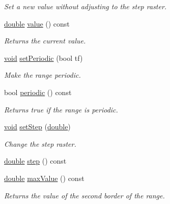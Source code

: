 \begin{DoxyCompactItemize}
\begin{DoxyCompactList}\small\item\em Set a new value without adjusting to the step raster. \end{DoxyCompactList}\item 
\hyperlink{_super_l_u_support_8h_a8956b2b9f49bf918deed98379d159ca7}{double} \hyperlink{class_qwt_double_range_a7777cf257c812579c4891512f1b6cad0}{value} () const 
\begin{DoxyCompactList}\small\item\em Returns the current value. \end{DoxyCompactList}\item 
\hyperlink{group___u_a_v_objects_plugin_ga444cf2ff3f0ecbe028adce838d373f5c}{void} \hyperlink{class_qwt_double_range_a95fa6a4e44fc47726d939155bb6f6f1f}{set\-Periodic} (bool tf)
\begin{DoxyCompactList}\small\item\em Make the range periodic. \end{DoxyCompactList}\item 
bool \hyperlink{class_qwt_double_range_ad1efbcbf29dbc74f3f378292b76b007b}{periodic} () const 
\begin{DoxyCompactList}\small\item\em Returns true if the range is periodic. \end{DoxyCompactList}\item 
\hyperlink{group___u_a_v_objects_plugin_ga444cf2ff3f0ecbe028adce838d373f5c}{void} \hyperlink{class_qwt_double_range_a29ed5fc66439def424a8ad773eea285d}{set\-Step} (\hyperlink{_super_l_u_support_8h_a8956b2b9f49bf918deed98379d159ca7}{double})
\begin{DoxyCompactList}\small\item\em Change the step raster. \end{DoxyCompactList}\item 
\hyperlink{_super_l_u_support_8h_a8956b2b9f49bf918deed98379d159ca7}{double} \hyperlink{class_qwt_double_range_a0cb8cc60548c10cb1d98e54387961967}{step} () const 
\item 
\hyperlink{_super_l_u_support_8h_a8956b2b9f49bf918deed98379d159ca7}{double} \hyperlink{class_qwt_double_range_a215275a1a8b4218a424ee8444c7fe409}{max\-Value} () const 
\begin{DoxyCompactList}\small\item\em Returns the value of the second border of the range. \end{DoxyCompactList}\item 

\end{DoxyCompactItemize}
